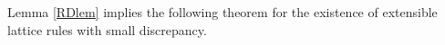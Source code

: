 \documentclass{article}
\renewcommand{\vec}[1]{\ensuremath{\mathbf{#1}}}
\newcommand{\vecsym}[1]{\ensuremath{\boldsymbol{#1}}}
\def\abs#1{\ensuremath{\left \lvert #1 \right \rvert}}
\DeclareMathOperator{\disc}{disc}
\newcommand{\one}{\vecsym 1}
\newcommand{\bfsigma}{\vecsym \sigma}
\newcommand{\bftau}{\vecsym \tau}
\renewcommand{\k}{\vec k}
\newcommand{\h}{\vec h}
\newcommand{\x}{\vec x}
\newcommand{\y}{\vec y}
\newcommand{\z}{\vec z}
\begin{document}
%

Lemma \ref{RDlem} implies the following theorem for the existence of
extensible lattice rules with small discrepancy.
\end{document}
